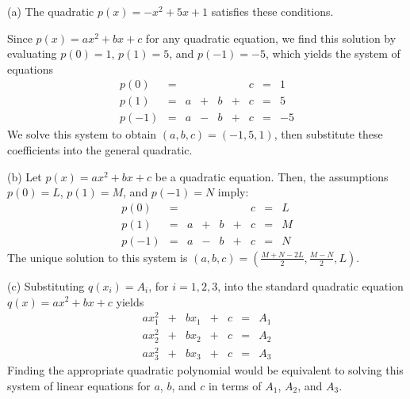 \documentclass{ximera}
\begin{document}
\begin{exercise}
\begin{solution}

(a) \ans The quadratic $p(x) = -x^2 + 5x + 1$ satisfies these conditions.

\soln Since $p(x) = ax^2 + bx + c$ for any quadratic equation, we find
this solution by evaluating $p(0) = 1$, $p(1) = 5$, and $p(-1) = -5$,
which yields the system of equations
\[
\begin{array}{lrrrrrrrr}
p(0) & = & & & & & c & = & 1 \\
p(1) & = & a & + & b & + & c & = & 5 \\
p(-1) & = & a & - & b & + & c & = & -5\end{array}
\]
We solve this system to obtain $(a,b,c) = (-1,5,1)$, then substitute
these coefficients into the general quadratic.

(b) Let $p(x) = ax^2 + bx + c$ be a quadratic equation.  Then, the
assumptions $p(0) = L$, $p(1) = M$, and $p(-1) = N$ imply:
\[
\begin{array}{lrrrrrrrr}
p(0) & = & & & & & c & = & L \\
p(1) & = & a & + & b & + & c & = & M \\
p(-1) & = & a & - & b & + & c & = & N\end{array}
\]
The unique solution to this system is $(a,b,c) =
(\frac{M + N - 2L}{2},\frac{M - N}{2},L)$.

(c) Substituting $q(x_i) = A_i$, for $i = 1,2,3$, into the standard
quadratic equation $q(x) = ax^2 + bx + c$ yields
\[
\begin{array}{ccccccc}
ax_1^2 & + & bx_1 & + & c & = & A_1 \\
ax_2^2 & + & bx_2 & + & c & = & A_2 \\
ax_3^2 & + & bx_3 & + & c & = & A_3\end{array}
\]
Finding the appropriate quadratic polynomial would be equivalent to
solving this system of linear equations for $a$, $b$, and $c$ in
terms of $A_1$, $A_2$, and $A_3$.




\end{solution}
\end{exercise}




\problemlabel

\end{document}
